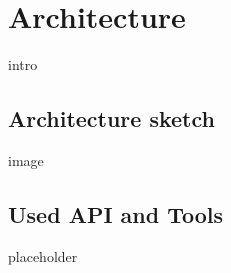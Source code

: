 \section{Architecture}
intro
\subsection*{Architecture sketch}
image
\subsection*{Used API and Tools}
placeholder